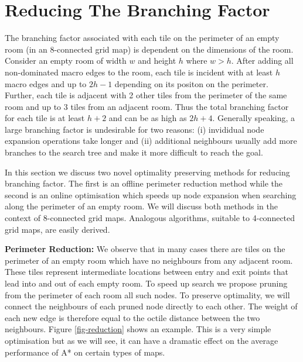 \section{Reducing The Branching Factor}
The branching factor associated with each tile on the perimeter of an empty room (in an 8-connected 
grid map) is dependent on the dimensions of the room.
Consider an empty room of width $w$ and height $h$ where $w > h$.
After adding all non-dominated macro edges to the room, each tile is incident with at least $h$ macro edges and up to $2h-1$ 
depending on its positon on the perimeter.
Further, each tile is adjacent with 2 other tiles from the perimeter of the same room and up to 3 tiles from an adjacent room.
Thus the total branching factor for each tile is at least $h + 2$ and can be as high
as $2h + 4$.
Generally speaking, a large branching factor is undesirable for two reasons:
(i) invididual node expansion operations take longer and (ii) additional neighbours usually 
add more branches to the search tree and make it more difficult to reach the goal.
\par
In this section we discuss two novel optimality preserving methods for reducing branching factor. 
The first is an offline perimeter reduction method while the second is an online optimisation which speeds up 
node expansion when searching along the perimeter of an empty room.
We will discuss both methods in the context of 8-connected grid maps.
Analogous algorithms, suitable to 4-connected grid maps, are easily derived.
\par \noindent \newline
\textbf{Perimeter Reduction:}
We observe that in many cases there are tiles on the perimeter of an empty room which have no neighbours from any 
adjacent room. 
These tiles represent intermediate locations between entry and exit points that lead into and out of each empty room.
To speed up search we propose pruning from the perimeter of each room all such nodes.
To preserve optimality, we will connect the neighbours of each pruned node directly to each other.
The weight of each new edge is therefore equal to the octile distance between the two neighbours.
Figure \ref{fig-reduction} shows an example.
This is a very simple optimisation but as we will see, it can have a dramatic effect on the average performance of
A* on certain types of maps.


